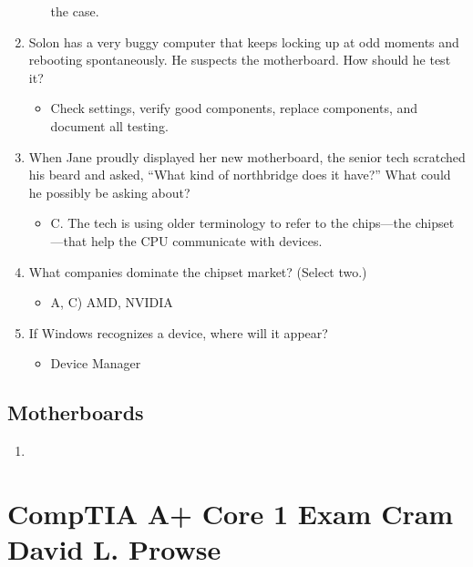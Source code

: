 \documentclass{article}
\begin{document}
\begin{enumerate}
\begin{itemize}
the case.
    \end{itemize}
    \item Solon has a very buggy computer that keeps locking up at odd
moments and rebooting spontaneously. He suspects the motherboard.
How should he test it?
    \begin{itemize}
        \item Check settings, verify good components, replace components,
and document all testing.
    \end{itemize}
    \item When Jane proudly displayed her new motherboard, the senior tech
scratched his beard and asked, “What kind of northbridge does it
have?” What could he possibly be asking about?
    \begin{itemize}
        \item C. The tech is using older terminology to refer to the chips—the
chipset—that help the CPU communicate with devices.
    \end{itemize}
    \item What companies dominate the chipset market? (Select two.)
    \begin{itemize}
        \item A, C) AMD, NVIDIA 
    \end{itemize}
    \item If Windows recognizes a device, where will it appear?
    \begin{itemize}
        \item Device Manager
    \end{itemize}
    
\end{enumerate}
\subsection{Motherboards} 
\begin{enumerate}
    \item 
\end{enumerate}
\section{CompTIA A+ Core 1 Exam Cram David L. Prowse} 
\end{document}
